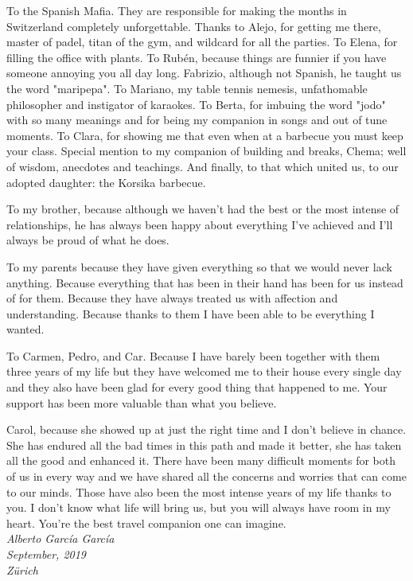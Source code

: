To the Spanish Mafia. They are responsible for making the months in Switzerland completely unforgettable. Thanks to Alejo, for getting me there, master of padel, titan of the gym, and wildcard for all the parties. To Elena, for filling the office with plants. To Rubén, because things are funnier if you have someone annoying you all day long. Fabrizio, although not Spanish, he taught us the word "maripepa". To Mariano, my table tennis nemesis, unfathomable philosopher and instigator of karaokes. To Berta, for imbuing the word "jodo" with so many meanings and for being my companion in songs and out of tune moments. To Clara, for showing me that even when at a barbecue you must keep your class. Special mention to my companion of building and breaks, Chema; well of wisdom, anecdotes and teachings. And finally, to that which united us, to our adopted daughter: the Korsika barbecue.

To my brother, because although we haven't had the best or the most intense of relationships, he has always been happy about everything I've achieved and I'll always be proud of what he does.

To my parents because they have given everything so that we would never lack anything. Because everything that has been in their hand has been for us instead of for them. Because they have always treated us with affection and understanding. Because thanks to them I have been able to be everything I wanted.

\newpage

To Carmen, Pedro, and Car. Because I have barely been together with them three years of my life but they have welcomed me to their house every single day and they also have been glad for every good thing that happened to me. Your support has been more valuable than what you believe.

Carol, because she showed up at just the right time and I don't believe in chance. She has endured all the bad times in this path and made it better, she has taken all the good and enhanced it. There have been many difficult moments for both of us in every way and we have shared all the concerns and worries that can come to our minds. Those have also been the most intense years of my life thanks to you. I don't know what life will bring us, but you will always have room in my heart. You're the best travel companion one can imagine.\\

\noindent\emph{Alberto García García}\\
\emph{September, 2019}\\
\emph{Zürich}\\

